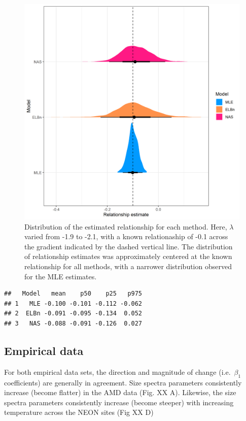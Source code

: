 \documentclass[
]{article}
\begin{document}
\begin{figure}
\centering
\includegraphics{figures/PLB_sim_small_relationship_density.png}
\caption{Distribution of the estimated relationship for each method.
Here, \(\lambda\) varied from -1.9 to -2.1, with a known relationaship
of -0.1 across the gradient indicated by the dashed vertical line. The
distribution of relationship estimates was approximately centered at the
known relationship for all methods, with a narrower distribution
observed for the MLE estimates.}
\end{figure}

\begin{verbatim}
##   Model   mean    p50    p25   p975
## 1   MLE -0.100 -0.101 -0.112 -0.062
## 2  ELBn -0.091 -0.095 -0.134  0.052
## 3   NAS -0.088 -0.091 -0.126  0.027
\end{verbatim}

\hypertarget{empirical-data-1}{%
\subsection{Empirical data}\label{empirical-data-1}}

For both empirical data sets, the direction and magnitude of change
(i.e.~\(\beta_1\) coefficients) are generally in agreement. Size spectra
parameters consistently increase (become flatter) in the AMD data (Fig.
XX A). Likewise, the size spectra parameters consistently increase
(become steeper) with increasing temperature across the NEON sites (Fig
XX D)
\end{document}
